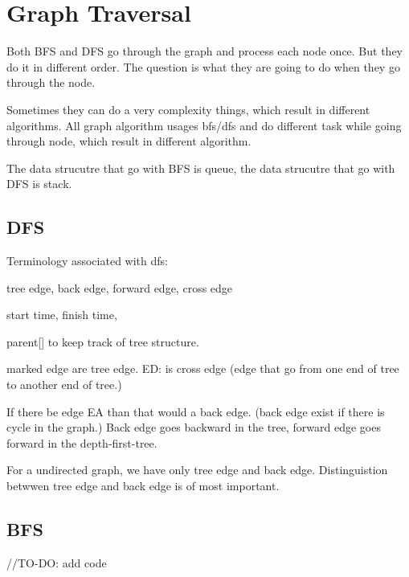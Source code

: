 \section{Graph Traversal}

Both BFS and DFS go through the graph and process each node once. But they do it in different order.
The question is what they are going to do when they go through the node.

Sometimes they can do a very complexity things, which result in different algorithms. All graph algorithm usages bfs/dfs and do different task while going through node, which result in different algorithm.

The data strucutre that go with BFS is queue, the data strucutre that go with DFS is stack.



\subsection{DFS}
Terminology associated with dfs:
\begin{compactenum}
    \item tree edge, back edge, forward edge, cross edge
    \item start time, finish time,
    \item parent[] to keep track of tree structure.
\end{compactenum}
marked edge are tree edge.
ED: is cross edge (edge that go from one end of tree to another end of tree.)

If there be edge EA than that would a back edge. (back edge exist if there is cycle in the graph.) Back edge goes backward in the tree, forward edge goes forward in the depth-first-tree.

For a undirected graph, we have only tree edge and back edge.
Distinguistion betwwen tree edge and back edge is of most important.

\subsection{BFS}
\begin{code3}
    //TO-DO: add code
\end{code3}


